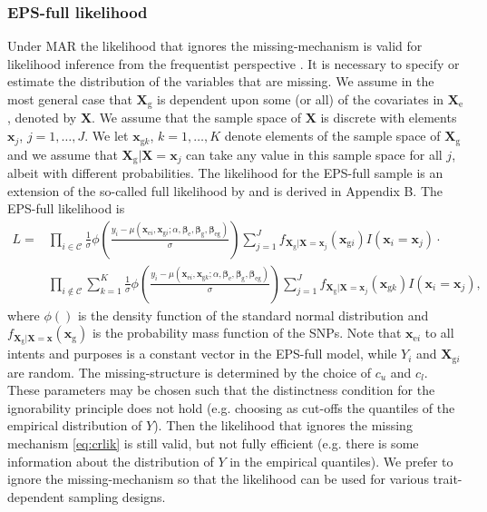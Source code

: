 \documentclass[10pt,a4paper]{article}
\def\bbetag{\bm{\beta}_{\text{g}}}
\def\bbetae{\bm{\beta}_{\text{e}}}
\def\bbetaeg{\bm{\beta}_{\text{eg}}}
\def\bx{\mathbf{x}}
\def\bX{\mathbf{X}}
\def\bxgi{\mathbf{x}_{\text{g}i}}
\def\bXgi{\mathbf{X}_{\text{g}i}}
\def\bxei{\mathbf{x}_{\text{e}i}}
\def\bxgk{\mathbf{x}_{\text{g}k}}
\def\bxg{\mathbf{x}_{\text{g}}}
\def\bXg{\mathbf{X}_{\text{g}}}
\def\bXe{\mathbf{X}_{\text{e}}}
\begin{document}
\subsubsection{EPS-full likelihood}
Under MAR the likelihood that ignores the missing-mechanism is valid for likelihood inference from the frequentist perspective \citep[page 120]{littlerubin2002}. It is necessary to specify or estimate the distribution of the variables that are missing. We assume in the most general case that $\bXg$ is dependent upon some (or all) of the covariates in $\bXe$, denoted by $\bX$. We assume that the sample space of $\bX$ is discrete with elements $\bx_j$, $j = 1,\ldots,J$. We let $\bxgk$, $k=1,\ldots,K$ denote elements of the sample space of $\bXg$ and we assume that $\bXg|\bX = \bx_j$ can take any value in this sample space for all $j$, albeit with different probabilities. The likelihood for the EPS-full sample is an extension of the so-called full likelihood by \cite{huang2007eps} and is derived in Appendix B. The EPS-full likelihood is
\begin{align}
L = & \prod_{i \in \mathcal{C}} \frac{1}{\sigma} \phi \left( \frac{y_i - \mu(\bxei, \bxgi; \alpha, \bbetae, \bbetag, \bbetaeg)}{\sigma} \right) \sum_{j=1}^J f_{\bXg|\bX = \bx_j}(\bxgi) I(\bx_i = \bx_j) \cdot \nonumber \\ & \prod_{i \not \in \mathcal{C}} \sum_{k =1}^K \frac{1}{\sigma} \phi \left( \frac{y_i - \mu(\bxei, \bxgk; \alpha, \bbetae, \bbetag, \bbetaeg)}{\sigma} \right)\sum_{j=1}^J f_{\bXg|\bX = \bx_j}(\bxgk) I(\bx_i = \bx_j),
\label{eq:crlik}
\end{align}
where $\phi()$ is the density function of the standard normal distribution and $f_{\bXg|\bX = \bx}(\bxg)$ is the probability mass function of the SNPs. Note that $\bxei$ to all intents and purposes is a constant vector in the EPS-full model, while $Y_i$ and $\bXgi$ are random. The missing-structure is determined by the choice of $c_u$ and $c_l$. These parameters may be chosen such that the distinctness condition for the ignorability principle \citep[page 119]{littlerubin2002} does not hold (e.g. choosing as cut-offs the quantiles of the empirical distribution of $Y$). Then the likelihood that ignores the missing mechanism \eqref{eq:crlik} is still valid, but not fully efficient (e.g. there is some information about the distribution of $Y$ in the empirical quantiles). We prefer to ignore the missing-mechanism so that the likelihood can be used for various trait-dependent sampling designs.
\end{document}
